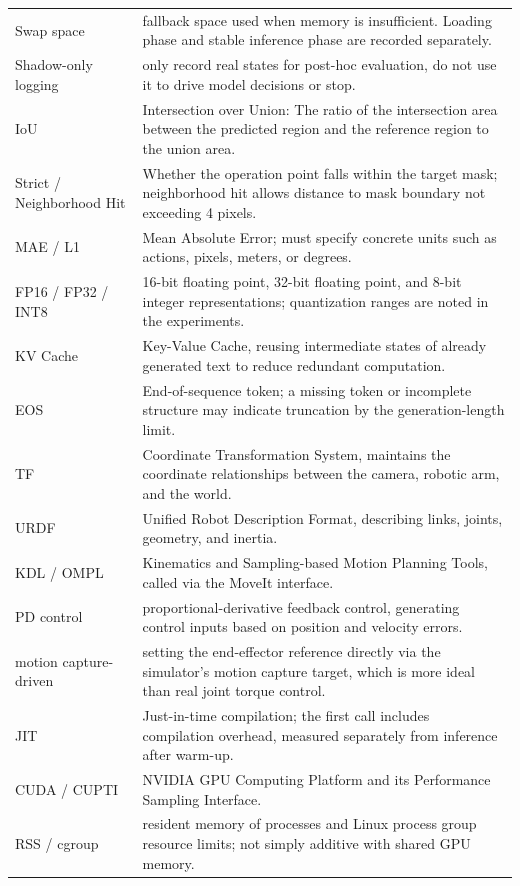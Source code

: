 \begin{longtable}{p{.18\linewidth}p{.72\linewidth}}
Swap space & fallback space used when memory is insufficient. Loading phase and stable inference phase are recorded separately.\\
Shadow-only logging & only record real states for post-hoc evaluation, do not use it to drive model decisions or stop.\\
IoU & Intersection over Union: The ratio of the intersection area between the predicted region and the reference region to the union area.\\
Strict / Neighborhood Hit & Whether the operation point falls within the target mask; neighborhood hit allows distance to mask boundary not exceeding 4 pixels.\\
MAE / L1 & Mean Absolute Error; must specify concrete units such as actions, pixels, meters, or degrees.\\
FP16 / FP32 / INT8 & 16-bit floating point, 32-bit floating point, and 8-bit integer representations; quantization ranges are noted in the experiments.\\
KV Cache & Key-Value Cache, reusing intermediate states of already generated text to reduce redundant computation.\\
EOS & End-of-sequence token; a missing token or incomplete structure may indicate truncation by the generation-length limit.\\
TF & Coordinate Transformation System, maintains the coordinate relationships between the camera, robotic arm, and the world.\\
URDF & Unified Robot Description Format, describing links, joints, geometry, and inertia.\\
KDL / OMPL & Kinematics and Sampling-based Motion Planning Tools, called via the MoveIt interface.\\
PD control & proportional-derivative feedback control, generating control inputs based on position and velocity errors.\\
motion capture-driven & setting the end-effector reference directly via the simulator's motion capture target, which is more ideal than real joint torque control.\\
JIT & Just-in-time compilation; the first call includes compilation overhead, measured separately from inference after warm-up.\\
CUDA / CUPTI & NVIDIA GPU Computing Platform and its Performance Sampling Interface.\\
RSS / cgroup & resident memory of processes and Linux process group resource limits; not simply additive with shared GPU memory.\\

\end{longtable}
